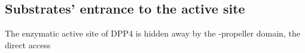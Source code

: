 \subsection{Substrates' entrance to the active site}

The enzymatic active site of DPP4 is hidden away by the \beta-propeller domain, the direct access 